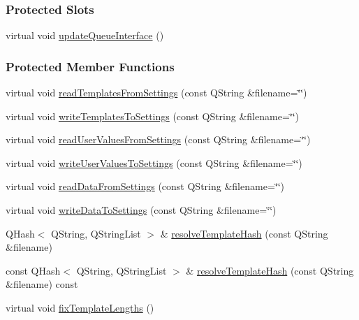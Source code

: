 \subsubsection*{Protected Slots}
\begin{DoxyCompactItemize}
\item 
virtual void \hyperlink{classGlobalSearch_1_1Optimizer_ad9c1899c333b7aa692bfe7ff252a6222}{update\+Queue\+Interface} ()
\end{DoxyCompactItemize}
\subsubsection*{Protected Member Functions}
\begin{DoxyCompactItemize}
\item 
virtual void \hyperlink{classGlobalSearch_1_1Optimizer_a2e365a82ae293c91516270f5e6534960}{read\+Templates\+From\+Settings} (const Q\+String \&filename=\char`\"{}\char`\"{})
\item 
virtual void \hyperlink{classGlobalSearch_1_1Optimizer_a9c1a95c53dcdb90dce83be3ad07ac719}{write\+Templates\+To\+Settings} (const Q\+String \&filename=\char`\"{}\char`\"{})
\item 
virtual void \hyperlink{classGlobalSearch_1_1Optimizer_a5cc22352d86ce253a0aa8d9b2ee8c951}{read\+User\+Values\+From\+Settings} (const Q\+String \&filename=\char`\"{}\char`\"{})
\item 
virtual void \hyperlink{classGlobalSearch_1_1Optimizer_afa884a475b8001a43e592f466cf2318c}{write\+User\+Values\+To\+Settings} (const Q\+String \&filename=\char`\"{}\char`\"{})
\item 
virtual void \hyperlink{classGlobalSearch_1_1Optimizer_a17b4f7c9fd176d976d652598497ff70e}{read\+Data\+From\+Settings} (const Q\+String \&filename=\char`\"{}\char`\"{})
\item 
virtual void \hyperlink{classGlobalSearch_1_1Optimizer_a115e78eb651af3e0fbb9fe188d50ecdc}{write\+Data\+To\+Settings} (const Q\+String \&filename=\char`\"{}\char`\"{})
\item 
Q\+Hash$<$ Q\+String, Q\+String\+List $>$ \& \hyperlink{classGlobalSearch_1_1Optimizer_a56df447e7eab1eb64bd66f4e3bd4594d}{resolve\+Template\+Hash} (const Q\+String \&filename)
\item 
const Q\+Hash$<$ Q\+String, Q\+String\+List $>$ \& \hyperlink{classGlobalSearch_1_1Optimizer_a139e0f44d76b023c82e48149e595cbc5}{resolve\+Template\+Hash} (const Q\+String \&filename) const 
\item 
virtual void \hyperlink{classGlobalSearch_1_1Optimizer_a8205c1cb67d2111c0a9e13e78a543f00}{fix\+Template\+Lengths} ()
\end{DoxyCompactItemize}
